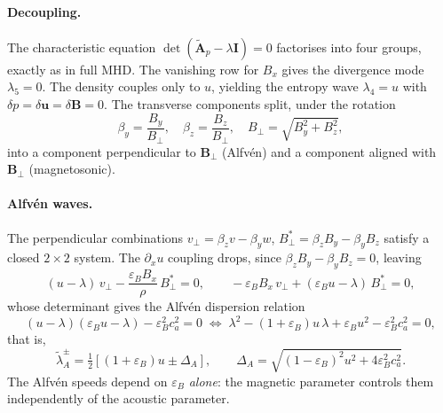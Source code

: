 \documentclass[a4paper,fleqn]{cas-sc}
\theoremstyle{remark}
\newcommand{\eps}{\varepsilon}
\newcommand{\epsB}{\eps_{B}}
\newcommand{\Bb}{\mathbf{B}}
\newcommand{\AAt}{\tilde{\mathbf{A}}}
\newcommand{\half}{\tfrac{1}{2}}
\begin{document}
\paragraph{Decoupling.}
The characteristic equation $\det(\AAt_p-\lambda\mathbf I)=0$ factorises into four
groups, exactly as in full MHD. The vanishing row for $B_x$ gives the divergence
mode $\lambda_5=0$. The density couples only to $u$, yielding the entropy wave
$\lambda_4=u$ with $\delta p=\delta\mathbf{u}=\delta\Bb=0$. The transverse components
split, under the rotation
\begin{equation}
\label{eq:beta}
\beta_y=\frac{B_y}{B_\perp},\quad\beta_z=\frac{B_z}{B_\perp},\quad
B_\perp=\sqrt{B_y^2+B_z^2},
\end{equation}
into a component perpendicular to $\Bb_\perp$ (Alfv\'en) and a component aligned
with $\Bb_\perp$ (magnetosonic).

\paragraph{Alfv\'en waves.}
The perpendicular combinations $v_\perp=\beta_z v-\beta_y w$,
$B_\perp^{\!*}=\beta_z B_y-\beta_y B_z$ satisfy a closed $2\times2$ system. The
$\partial_x u$ coupling drops, since $\beta_z B_y-\beta_y B_z=0$, leaving
\begin{equation}
(u-\lambda)\,v_\perp-\frac{\epsB B_x}{\rho}\,B_\perp^{\!*}=0,\qquad
-\epsB B_x\,v_\perp+(\epsB u-\lambda)\,B_\perp^{\!*}=0,
\end{equation}
whose determinant gives the Alfv\'en dispersion relation
\begin{equation}
\label{eq:alfven_disp}
(u-\lambda)(\epsB u-\lambda)-\epsB^2 c_a^2=0
\;\Longleftrightarrow\;
\lambda^2-(1+\epsB)u\,\lambda+\epsB u^2-\epsB^2 c_a^2=0,
\end{equation}
that is,
\begin{equation}
\label{eq:alfven_eig}
\tilde\lambda_A^{\pm}=\half\!\left[(1+\epsB)u\pm\Delta_A\right],\qquad
\Delta_A=\sqrt{(1-\epsB)^2u^2+4\epsB^2c_a^2}.
\end{equation}
The Alfv\'en speeds depend on $\epsB$ \emph{alone}: the magnetic parameter
controls them independently of the acoustic parameter.
\end{document}
